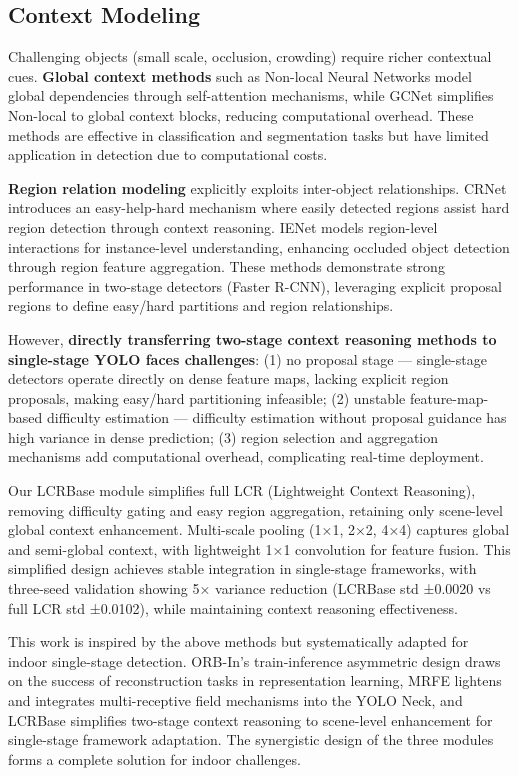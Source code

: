 \documentclass[journal]{IEEEtran}
\begin{document}
\subsection{Context Modeling}

Challenging objects (small scale, occlusion, crowding) require richer contextual cues. \textbf{Global context methods} such as Non-local Neural Networks \cite{wang2018non} model global dependencies through self-attention mechanisms, while GCNet \cite{cao2019gcnet} simplifies Non-local to global context blocks, reducing computational overhead. These methods are effective in classification and segmentation tasks but have limited application in detection due to computational costs.

\textbf{Region relation modeling} explicitly exploits inter-object relationships. CRNet \cite{chi2020crnet} introduces an easy-help-hard mechanism where easily detected regions assist hard region detection through context reasoning. IENet \cite{hu2021ienet} models region-level interactions for instance-level understanding, enhancing occluded object detection through region feature aggregation. These methods demonstrate strong performance in two-stage detectors (Faster R-CNN), leveraging explicit proposal regions to define easy/hard partitions and region relationships.

However, \textbf{directly transferring two-stage context reasoning methods to single-stage YOLO faces challenges}: (1) no proposal stage — single-stage detectors operate directly on dense feature maps, lacking explicit region proposals, making easy/hard partitioning infeasible; (2) unstable feature-map-based difficulty estimation — difficulty estimation without proposal guidance has high variance in dense prediction; (3) region selection and aggregation mechanisms add computational overhead, complicating real-time deployment.

Our LCRBase module simplifies full LCR (Lightweight Context Reasoning), removing difficulty gating and easy region aggregation, retaining only scene-level global context enhancement. Multi-scale pooling (1×1, 2×2, 4×4) captures global and semi-global context, with lightweight 1×1 convolution for feature fusion. This simplified design achieves stable integration in single-stage frameworks, with three-seed validation showing 5× variance reduction (LCRBase std ±0.0020 vs full LCR std ±0.0102), while maintaining context reasoning effectiveness.

This work is inspired by the above methods but systematically adapted for indoor single-stage detection. ORB-In's train-inference asymmetric design draws on the success of reconstruction tasks in representation learning, MRFE lightens and integrates multi-receptive field mechanisms into the YOLO Neck, and LCRBase simplifies two-stage context reasoning to scene-level enhancement for single-stage framework adaptation. The synergistic design of the three modules forms a complete solution for indoor challenges.
\end{document}
